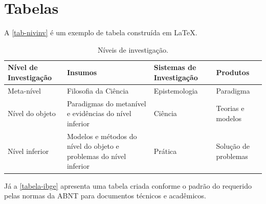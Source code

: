 \section{Tabelas}

A \autoref{tab-nivinv} é um exemplo de tabela construída em
\LaTeX.

\begin{table}[htb]
\ABNTEXfontereduzida
\caption[Níveis de investigação]{Níveis de investigação.}
\label{tab-nivinv}
\begin{tabular}{p{2.6cm}|p{6.0cm}|p{2.25cm}|p{3.40cm}}
   \textbf{Nível de Investigação} & \textbf{Insumos}  & \textbf{Sistemas de Investigação}  & \textbf{Produtos}  \\
    \hline
    Meta-nível & Filosofia\index{filosofia} da Ciência  & Epistemologia &
    Paradigma  \\
    \hline
    Nível do objeto & Paradigmas do metanível e evidências do nível inferior &
    Ciência  & Teorias e modelos \\
    \hline
    Nível inferior & Modelos e métodos do nível do objeto e problemas do nível inferior & Prática & Solução de problemas  \\
\end{tabular}
\end{table}

Já a \autoref{tabela-ibge} apresenta uma tabela criada conforme o padrão do
\cite{ibge1993} requerido pelas normas da ABNT para documentos técnicos e
acadêmicos.

\begin{table}[htb]
\end{table}


